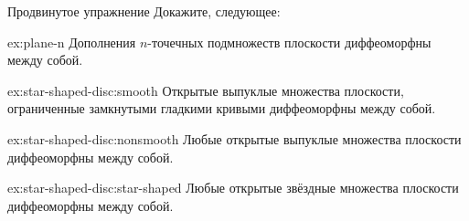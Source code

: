 \begin{thm}{Продвинутое упражнение}\label{ex:star-shaped-disc}
Докажите, следующее:

\begin{subthm}{ex:plane-n}
Дополнения $n$-точечных подмножеств плоскости диффеоморфны между собой.
\end{subthm}

\begin{subthm}{ex:star-shaped-disc:smooth}
Открытые выпуклые множества плоскости, ограниченные замкнутыми гладкими кривыми диффеоморфны между собой.
\end{subthm}

{\sloppy

\begin{subthm}{ex:star-shaped-disc:nonsmooth}
Любые открытые выпуклые множества плоскости диффеоморфны между собой.
\end{subthm}

\begin{subthm}{ex:star-shaped-disc:star-shaped}
Любые открытые звёздные множества плоскости диффеоморфны между собой.
\end{subthm}

}

\end{thm}
